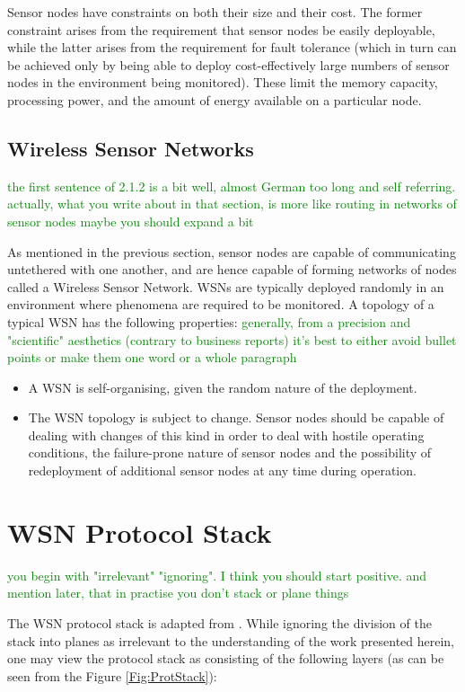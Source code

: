 Sensor nodes have constraints on both their size and their cost. The former 
constraint arises from the requirement that sensor nodes be easily deployable, 
while the latter arises from the requirement for fault tolerance (which in turn 
can be achieved only by being able to deploy cost-effectively large numbers of
sensor nodes in the environment being monitored). These limit the memory capacity, processing 
power, and the amount of energy available on a particular node.

\subsection{Wireless Sensor Networks}
\textcolor{green}{the first sentence of 2.1.2 is a bit well, almost German
too long and self referring. actually, what you write about in that section, is more like routing in networks of sensor nodes
maybe you should expand a bit}

As mentioned in the previous section, sensor nodes are capable of communicating
untethered with one another, and are hence capable of forming networks of nodes
called a Wireless Sensor Network. WSNs are typically deployed randomly in an
environment where phenomena are required to be monitored. A topology of a typical
WSN has the following properties:
\textcolor{green}{generally, from a precision and "scientific" aesthetics (contrary to business reports) it's best to either avoid bullet points or make them one word or a whole paragraph}

\begin{itemize}
\item A WSN is self-organising, given the random nature of the deployment.
\item The WSN topology is subject to change. Sensor nodes should be capable of 
dealing with changes of this kind in order to deal with hostile operating 
conditions, the failure-prone nature of sensor nodes and the possibility of 
redeployment of additional sensor nodes at any time during operation.
\end{itemize}

\section{WSN Protocol Stack} \label{sec:WSNProtStack}
\textcolor{green}{you begin with "irrelevant" "ignoring". I think you should
start positive. and mention later, that in practise you don't stack or plane
things }

The WSN protocol stack \cite{SensorSurveyAkyildiz:2002} is adapted from 
\cite{ComputerNetworksTannenbaum:2003}. While ignoring the division of the 
stack into planes as irrelevant to the understanding of the work presented 
herein, one may view the protocol stack as consisting of the following layers
(as can be seen from the Figure \ref{Fig:ProtStack}):


